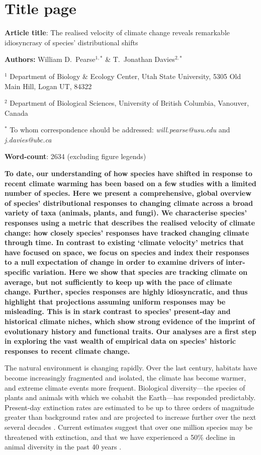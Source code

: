 \documentclass[12pt]{report}
\begin{document}

\section*{Title page}
\textbf{Article title}: The realised velocity of climate change
reveals remarkable idiosyncrasy of species' distributional shifts

\textbf{Authors:} William D.\ Pearse$^{1,*}$ \& T.\ Jonathan
Davies$^{2,*}$

$^1$ Department of Biology \& Ecology Center, Utah State University,
5305 Old Main Hill, Logan UT, 84322

$^2$ Department of Biological Sciences, University of British
Columbia, Vanouver, Canada

$^*$ To whom correspondence should be addressed:
\emph{will.pearse@usu.edu} and \emph{j.davies@ubc.ca}

\textbf{Word-count}: 2634 (excluding figure legends)

\clearpage
\textbf{To date, our understanding of how species have shifted in
  response to recent climate warming has been based on a few studies
  with a limited number of species. Here we present a comprehensive,
  global overview of species' distributional responses to changing
  climate across a broad variety of taxa (animals, plants, and
  fungi). We characterise species' responses using a metric that
  describes the realised velocity of climate change: how closely
  species' responses have tracked changing climate through time. In
  contrast to existing `climate velocity' metrics that have focused on
  space, we focus on species and index their responses to a null
  expectation of change in order to examine drivers of inter-specific
  variation. Here we show that species are tracking climate on
  average, but not sufficiently to keep up with the pace of climate
  change. Further, species responses are highly idiosyncratic, and
  thus highlight that projections assuming uniform responses may be
  misleading.  This is in stark contrast to species' present-day and
  historical climate niches, which show strong evidence of the imprint
  of evolutionary history and functional traits. Our analyses are a
  first step in exploring the vast wealth of empirical data on
  species' historic responses to recent climate change.}

The natural environment is changing rapidly. Over the last century,
habitats have become increasingly fragmented and
isolated\supercite{Haddad2015}, the climate has become warmer, and
extreme climate events more frequent\supercite{IPCC2014}. Biological
diversity---the species of plants and animals with which we cohabit
the Earth---has responded predictably. Present-day extinction rates
are estimated to be up to three orders of magnitude greater than
background rates \supercite{Pimm2014} and are projected to increase
further over the next several decades \supercite{MEA2005}. Current
estimates suggest that over one million species may be threatened with
extinction\supercite{IPBESland2019}, and that we have experienced a
50\% decline in animal diversity in the past 40 years
\supercite{McLellan2014}.
\end{document}
